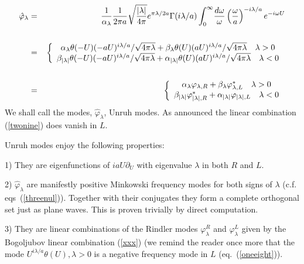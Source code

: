 \documentclass[12pt,oneside]{report}
\def\om{\omega	}
\def\la{\lambda}
\begin{document}
\begin{eqnarray}
\hat \varphi_\la &=&
{1 \over \alpha_\la} {1 \over 2 \pi a} \sqrt{ \vert \la \vert \over 4 \pi }
e^{\pi \la / 2 a} \Gamma(i \la /a )
  \int_0^\infty \! { d \om \over \om} 
\left( \om \over a \right)^{-i \la /a} 
e^{-i \om U} \nonumber\\
&\ &\nonumber\\
\ &=& \left.\left \{ 
\begin{array}{c}
\alpha_\la \theta(-U) { (-aU)^{i\la/a} /\sqrt{4 \pi \la}} + 
\beta_\la \theta(U) { (aU)^{i\la/a} / \sqrt{4 \pi \la}} 
\quad \la >0
\\ 
 \beta_{\vert \la \vert}\theta(-U) { (-aU)^{i\la/a} /\sqrt{4 \pi \la}}
+ \alpha_{\vert \la \vert} { \theta(U) (aU)^{i\la/a} / \sqrt{4 \pi \la}}
\quad \la <0
\end{array} \right.\right.
\nonumber\\
&\ &\nonumber\\
\ &=& \left.\left \{ 
\begin{array}{c}
\alpha_\la \varphi_{\la,R} + \beta_\la \varphi_{\la,L}^* \quad \la >0 \\
\beta_{\vert \la \vert}\varphi^*_{{\vert \la \vert},R} + 
\alpha_{\vert \la \vert} \varphi_{{\vert \la \vert},L} \quad
\la < 0
\end{array} \right.\right.
\label{xxx}
\end{eqnarray}
We shall call the modes, $\hat \varphi_\la$, Unruh modes. As announced the
linear combination (\ref{twonine}) does vanish in $L$. 

Unruh modes enjoy the following
properties:

1) They are eigenfunctions of $i aU \partial_U $ with eigenvalue $ \la$ in both
$R$ and $L$.

2) $\hat \varphi_\la$ are manifestly positive Minkowski frequency modes for
both signs of $\la$ (c.f. eqs~(\ref{threenul})). Together with their
conjugates they form a complete orthogonal set just as plane waves.
This is proven trivially by direct computation.

3) They are linear combinations of the Rindler modes $\varphi_\la^R$ and
$\varphi_\la^L$ given by the Bogoljubov linear combination (\ref{xxx}) (we
remind the reader once more that the mode $U^{i\la/a}\theta(U) , \la >0$ is
a negative frequency mode in $L$ (eq.~(\ref{oneeight})).
\end{document}

